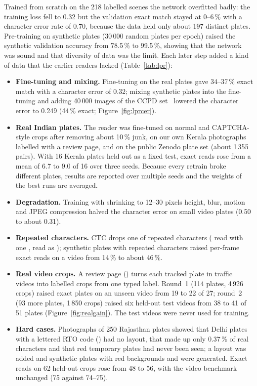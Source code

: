 Trained from scratch on the 218 labelled scenes the network overfitted
badly: the training loss fell to 0.32 but the validation exact match stayed at
0--6\,\% with a character error rate of 0.70, because the data held only about
197 distinct plates. Pre-training on synthetic plates (30\,000 random plates per
epoch) raised the synthetic validation accuracy from 78.5\,\% to 99.5\,\%,
showing that the network was sound and that diversity of data was the limit.
Each later step added a kind of data that the earlier readers lacked
(Table~\ref{tab:lpr}):
\begin{itemize}
  \item \textbf{Fine-tuning and mixing.} Fine-tuning on the real plates gave
        34--37\,\% exact match with a character error of 0.32; mixing synthetic
        plates into the fine-tuning and adding 40\,000 images of the CCPD
        set~\cite{xu2018ccpd} lowered the character error to 0.249 (44\,\%
        exact; Figure~\ref{fig:lprcer}).
  \item \textbf{Real Indian plates.} The reader was fine-tuned on normal and
        CAPTCHA-style crops after removing about 10\,\% junk, on our own Kerala
        photographs labelled with a review page, and on the public Zenodo
        plate set (about 1\,355 pairs). With 16 Kerala plates held out as a fixed
        test, exact reads rose from a mean of 6.7 to 9.0 of 16 over three seeds.
        Because every retrain broke different plates, results are reported over
        multiple seeds and the weights of the best runs are averaged.
  \item \textbf{Degradation.} Training with shrinking to 12--30 pixels height,
        blur, motion and JPEG compression halved the character error on small
        video plates (0.50 to about 0.31).
  \item \textbf{Repeated characters.} CTC drops one of repeated characters
        ( read with one ,  read as
        ); synthetic plates with repeated characters raised per-frame
        exact reads on a video from 14\,\% to about 46\,\%.
  \item \textbf{Real video crops.} A review page ()
        turns each tracked plate in traffic videos into labelled crops from one
        typed label. Round~1 (114 plates, 4\,926 crops) raised exact plates on
        an unseen video from 19 to 22 of 27; round~2 (93 more plates, 1\,850
        crops) raised six held-out test videos from 38 to 41 of 51 plates
        (Figure~\ref{fig:realgain}). The test videos were never used for
        training.
  \item \textbf{Hard cases.} Photographs of 250 Rajasthan plates showed that
        Delhi plates with a lettered RTO code () had no
        layout, that  made up only 0.37\,\% of real characters
        and that red temporary plates had never been seen; a layout was added
        and synthetic plates with red backgrounds and  were generated.
        Exact reads on 62 held-out crops rose from 48 to 56, with the video
        benchmark unchanged (75 against 74--75).
\end{itemize}

